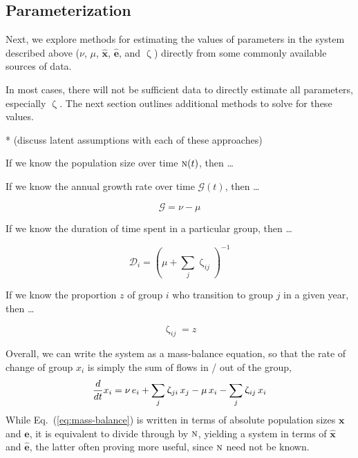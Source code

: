 \documentclass{article}
\numberwithin{equation}{section}
\newcommand{\eq}[1]{Eq.~(\ref{#1})}
\renewcommand{\zeta}{\upzeta}
\newcommand{\x}{\hat{x}}
\newcommand{\e}{\hat{e}}
\newcommand{\N}{\textsc{n}}
\begin{document}
\subsection{Parameterization}
Next, we explore methods for estimating the values of parameters
in the system described above
($\nu$, $\mu$, $\bm{\x}$, $\bm{\e}$, and $\zeta$)
directly from some commonly available sources of data.
\par
In most cases, there will not be sufficient data to directly estimate all parameters,
especially $\zeta$.
The next section outlines additional methods to solve for these values.
\par
* (discuss latent assumptions with each of these approaches)

If we know the population size over time $\N(t)$, then \dots

If we know the annual growth rate over time $\mathcal{G}(t)$, then \dots

\begin{equation}\label{eq:pop-growth}
  \mathcal{G} = \nu - \mu
\end{equation}

If we know the duration of time spent in a particular group, then \dots

\begin{equation}\label{eq:duration}
  \mathcal{D}_i = {\left(\mu + \sum_{j}{\zeta_{ij}}\right)}^{-1}
\end{equation}

If we know the proportion $z$ of group $i$ who transition to group $j$ in a given year, then \dots

\begin{equation}
\zeta_{ij} = z
\end{equation}

Overall, we can write the system as a mass-balance equation,
so that the rate of change of group $x_i$
is simply the sum of flows in / out of the group,
\begin{equation}\label{eq:mass-balance}
  \frac{d}{dt}x_i
  = \nu \thinspace e_i + \sum_{j}{\zeta_{ji} \thinspace x_j}
  - \mu \thinspace x_i - \sum_{j}{\zeta_{ij} \thinspace x_i}
\end{equation}
While \eq{eq:mass-balance} is written in terms of absolute population sizes $\bm{x}$ and $\bm{e}$,
it is equivalent to divide through by $\N$, yielding a system in terms of $\bm{\x}$ and $\bm{\e}$,
the latter often proving more useful, since $\N$ need not be known.
\end{document}
